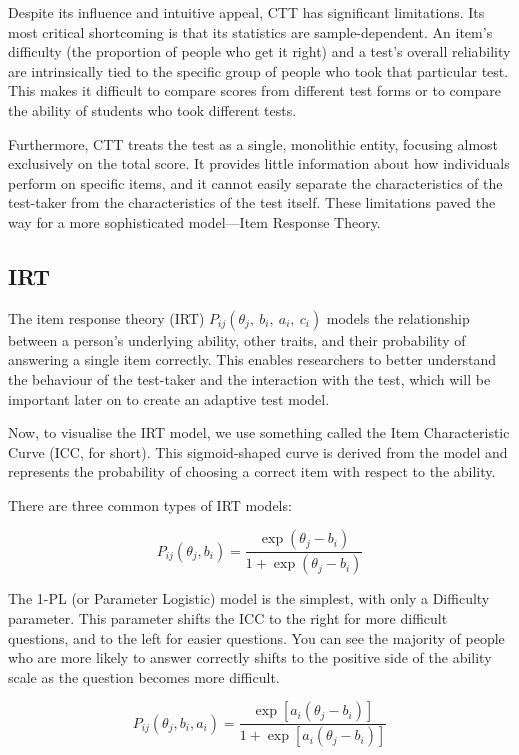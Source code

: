 \documentclass{article}
\begin{document}
Despite its influence and intuitive appeal, CTT has significant limitations. Its most critical shortcoming is that its statistics are sample-dependent. An item's difficulty (the proportion of people who get it right) and a test's overall reliability are intrinsically tied to the specific group of people who took that particular test. This makes it difficult to compare scores from different test forms or to compare the ability of students who took different tests. 

Furthermore, CTT treats the test as a single, monolithic entity, focusing almost exclusively on the total score. It provides little information about how individuals perform on specific items, and it cannot easily separate the characteristics of the test-taker from the characteristics of the test itself. These limitations paved the way for a more sophisticated model—Item Response Theory.

\subsection*{IRT}

The item response theory (IRT) $P_{ij}\left(\theta_j,\ b_i,\ a_i,\ c_i\right)$ models the relationship between a person's underlying ability, other traits, and their probability of answering a single item correctly. This enables researchers to better understand the behaviour of the test-taker and the interaction
with the test, which will be important later on to create an adaptive test model.

Now, to visualise the IRT model, we use something called the Item Characteristic Curve (ICC, for short). This sigmoid-shaped curve is derived from the model and represents the probability of choosing a correct item with respect to the ability. 

There are three common types of IRT models:

\[
P_{ij}\left(\theta_j,b_i\right)=\frac{\exp(\theta_j-b_i)}{1+\exp(\theta_j-b_i)}
\]

The 1-PL (or Parameter Logistic) model is the simplest, with only a Difficulty parameter. This parameter shifts the ICC to the right for more difficult questions, and to the left for easier questions. You can see the majority of people who are more likely to answer correctly shifts to the positive side of the ability scale as the question becomes more difficult.

\[
P_{ij}\left(\theta_j,b_i,a_i\right)=\frac{\exp\left[a_i(\theta_j-b_i)\right]}{1+\exp\left[a_i(\theta_j-b_i)\right]}
\]
\end{document}
